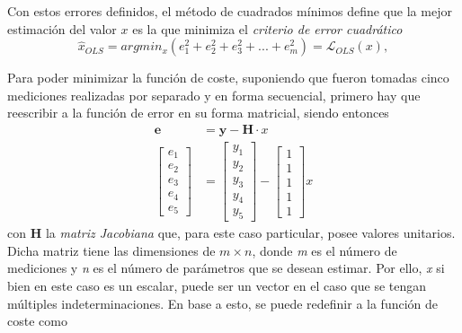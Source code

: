 Con estos errores definidos, el método de cuadrados mínimos define que la mejor estimación del valor $x$ es la que minimiza el \textit{criterio de error cuadrático}
\begin{equation}
    \hat{x}_{OLS} = argmin_x(e_1^2+e_2^2+e_3^2+...+e_m^2) = \mathscr{L}_{OLS}(x),
    \label{eq:squarederrorcriterion}
\end{equation}


% 

Para poder minimizar la función de coste, suponiendo que fueron tomadas cinco mediciones realizadas por separado y en forma secuencial, primero hay que reescribir a la función de error en su forma matricial, siendo entonces
\begin{align}
    \bm{e} &= \bm{y} - \bm{H}\cdot x \\
    \begin{bmatrix}
        e_1\\ e_2\\ e_3\\ e_4\\ e_5
    \end{bmatrix}
    &= 
    \begin{bmatrix}
        y_1\\ y_2\\ y_3\\ y_4\\ y_5
    \end{bmatrix}
    -
    \begin{bmatrix}
        1\\ 1\\ 1\\ 1\\ 1
    \end{bmatrix}
    x
\end{align}
con $\bm{H}$ la \textit{matriz Jacobiana} que, para este caso particular, posee valores unitarios. Dicha matriz tiene las dimensiones de $m\times n$, donde \textit{m} es el número de mediciones y \textit{n} es el número de parámetros que se desean estimar. Por ello, \textit{x} si bien en este caso es un escalar, puede ser un vector en el caso que se tengan múltiples indeterminaciones. En base a esto, se puede redefinir a la función de coste como

